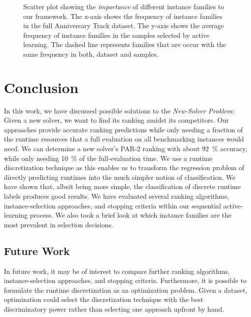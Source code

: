 \documentclass[runningheads]{llncs}
\begin{document}
\begin{figure}[tb!]
	\centering
	\caption{
		Scatter plot showing the \emph{importance} of different instance families to our framework.
		The x-axis shows the frequency of instance families in the full Anniversary Track dataset.
		The y-axis shows the average frequency of instance families in the samples selected by active learning.
		The dashed line represents families that are occur with the same frequency in both, dataset and samples.
	}
	\label{fig:annifinalfamilies}
\end{figure}

\section{Conclusion}

In this work, we have discussed possible solutions to the \emph{New-Solver Problem}:
Given a new solver, we want to find its ranking amidst its competitors.
Our approaches provide accurate ranking predictions while only needing a fraction of the runtime resources that a full evaluation on all benchmarking instances would need.
We can determine a new solver's PAR-2 ranking with about \SI{92}{\%} accuracy, while only needing \SI{10}{\%} of the full-evaluation time.
We use a runtime discretization technique as this enables us to transform the regression problem of directly predicting runtimes into the much simpler notion of classification.
We have shown that, albeit being more simple, the classification of discrete runtime labels produces good results.
We have evaluated several ranking algorithms, instance-selection approaches, and stopping criteria within our sequential active-learning process.
We also took a brief look at which instance families are the most prevalent in selection decisions.

\subsection{Future Work}

In future work, it may be of interest to compare further ranking algorithms, instance-selection approaches, and stopping criteria.
Furthermore, it is possible to formulate the runtime discretization as an optimization problem.
Given a dataset, optimization could select the discretization technique with the best discriminatory power rather than selecting one approach upfront by hand.
\end{document}
